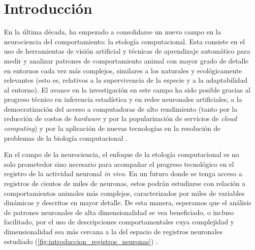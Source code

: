 \chapter*{Introducción}\label{cha:introduccion}



\clearpage

En la última década, ha empezado a consolidarse un nuevo campo en la neurociencia del comportamiento: la etología computacional. Esta consiste en el uso de herramientas de visión artificial y técnicas de aprendizaje automático para medir y analizar patrones de comportamiento animal con mayor grado de detalle en entornos cada vez más complejos, similares a los naturales y ecológicamente relevantes (esto es, relativos a la supervivencia de la especie y a la adaptabilidad al entorno). El avance en la investigación en este campo ha sido posible gracias al progreso técnico en inferencia estadística y en redes neuronales artificiales, a la democratización del acceso a computadoras de alto rendimiento (tanto por la reducción de costos de \textit{hardware} y por la popularización de servicios de \textit{cloud computing}) y por la aplicación de nuevas tecnologías en la resolución de problemas de la biología computacional \cite{datta_computational_neuroethology}.

En el campo de la neurociencia, el enfoque de la etología computacional es no solo prometedor sino necesario para acompañar el progreso tecnológico en el registro de la actividad neuronal \textit{in vivo}. En un futuro donde se tenga acceso a registros de cientos de miles de neuronas, estos podrán estudiarse con relación a comportamientos animales más complejos, caracterizados por miles de variables dinámicas y descritos en mayor detalle. De esta manera, esperamos que el análisis de patrones neuronales de alta dimensionalidad se vea beneficiado, o incluso facilitado, por el uso de descripciones comportamentales cuya complejidad y dimensionalidad sea más cercana a la del espacio de registros neuronales estudiado (\autoref{fig:introduccion_registros_neuronas}) \cite{datta_computational_neuroethology, glaser_kording_multimodal_neuroscience, neuron_recording_duplication, lecoq_neuron_microscopy, demas_lbm, chen_neuron_recording_scales}.

